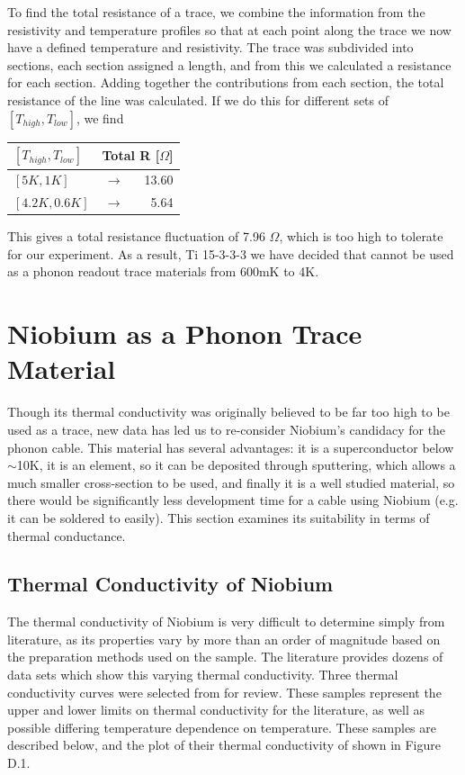 \documentclass{report}
\begin{document}
\begin{appendices}
To find the total resistance of a trace, we combine the information from the resistivity and temperature profiles so that at each point along the trace we now have a defined temperature and resistivity. The trace was subdivided into sections, each section assigned a length, and from this we calculated a resistance for each section. Adding together the contributions from each section, the total resistance of the line was calculated. If we do this for different sets of $[T_{high},T_{low}]$, we find

\begin{table}[h]
\centering
\begin{threeparttable}
\begin{tabular}{lcr}
\toprule
$[T_{high},T_{low}]$ & \multicolumn{2}{r}{Total R [$\Omega$]} \\
\midrule
$[5K,1K]$ & $\rightarrow$ & 13.60 \\
$[4.2K,0.6K]$ & $\rightarrow$ & 5.64 \\
\bottomrule
\end{tabular}
\end{threeparttable}
\end{table}

This gives a total resistance fluctuation of 7.96 $\Omega$, which is too high to tolerate for our experiment. As a result, Ti 15-3-3-3 we have decided that cannot be used as a phonon readout trace materials from 600mK to 4K.

\chapter{Niobium as a Phonon Trace Material}

Though its thermal conductivity was originally believed to be far too high to be used as a trace, new data has led us to re-consider Niobium's candidacy for the phonon cable. This material has several advantages: it is a superconductor below $\sim$10K, it is an element, so it can be deposited through sputtering, which allows a much smaller cross-section to be used, and finally it is a well studied material, so there would be significantly less development time for a cable using Niobium (e.g. it can be soldered to easily). This section examines its suitability in terms of thermal conductance.

\section{Thermal Conductivity of Niobium}
The thermal conductivity of Niobium is very difficult to determine simply from literature, as its properties vary by more than an order of magnitude based on the preparation methods used on the sample. The literature provides dozens of data sets which show this varying thermal conductivity. Three thermal conductivity curves were selected from \cite{tou} for review. These samples represent the upper and lower limits on thermal conductivity for the literature, as well as possible differing temperature dependence on temperature. These samples are described below, and the plot of their thermal conductivity of shown in Figure D.1.


\end{appendices}
\end{document}
